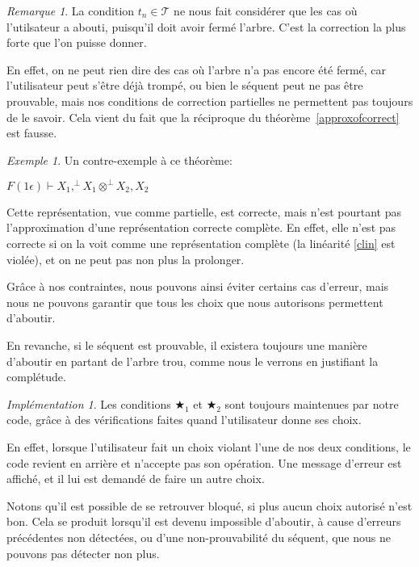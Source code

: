 \documentclass[11pt,a4paper]{article}
\theoremstyle{plain}
\theoremstyle{definition}
\theoremstyle{remark}
\newtheorem{remark}{Remarque}
\newtheorem{example}{Exemple}
\newtheorem{implementation}{Implémentation}
\newcommand*{\orth}{^\perp}
\newcommand*{\tensor}{\otimes}
\newcommand*{\trees}{\ensuremath{\mathcal{T}}}
\newcommand*{\exactcond}{\bigstar_1}
\newcommand*{\exactcondbis}{\bigstar_2}
\begin{document}
\begin{remark}
    La condition $t_n \in \trees$ ne nous fait considérer que les cas où l'utilsateur a abouti, puisqu'il doit avoir fermé l'arbre. C'est la correction la plus forte que l'on puisse donner.
    
    En effet, on ne peut rien dire des cas où l'arbre n'a pas encore été fermé, car l'utilisateur peut s'être déjà trompé, ou bien le séquent peut ne pas être prouvable, mais nos conditions de correction partielles ne permettent pas toujours de le savoir. Cela vient du fait que la réciproque du théorème~\ref{approxofcorrect} est fausse.

    \begin{example}
        Un contre-exemple à ce théorème:

        $F(1 \epsilon) \vdash X_1, \orth{X_1} \tensor \orth{X_2}, X_2$

        Cette représentation, vue comme partielle, est correcte, mais n'est pourtant pas l'approximation d'une représentation correcte complète. En effet, elle n'est pas correcte si on la voit comme une représentation complète (la linéarité \ref{clin} est violée), et on ne peut pas non plus la prolonger.
    \end{example}
    
    Grâce à nos contraintes, nous pouvons ainsi éviter certains cas d'erreur, mais nous ne pouvons garantir que tous les choix que nous autorisons permettent d'aboutir.  
    
    En revanche, si le séquent est prouvable, il existera toujours une manière d'aboutir en partant de l'arbre trou, comme nous le verrons en justifiant la complétude.
\end{remark}

\begin{implementation}
    Les conditions $\exactcond$ et $\exactcondbis$ sont toujours maintenues par notre code, grâce à des vérifications faites quand l'utilisateur donne ses choix.

    En effet, lorsque l'utilisateur fait un choix violant l'une de nos deux conditions, le code revient en arrière et n'accepte pas son opération. Une message d'erreur est affiché, et il lui est demandé de faire un autre choix. 
    
    Notons qu'il est possible de se retrouver bloqué, si plus aucun choix autorisé n'est bon. Cela se produit lorsqu'il est devenu impossible d'aboutir, à cause d'erreurs précédentes non détectées, ou d'une non-prouvabilité du séquent, que nous ne pouvons pas détecter non plus.
\end{implementation}
\end{document}
